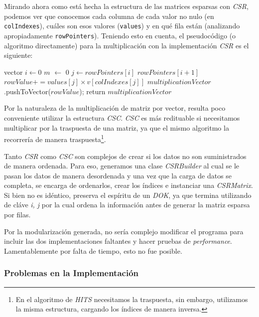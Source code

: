 Mirando ahora como está hecha la estructura de las matrices esparsas con \textit{CSR}, podemos ver que conocemos cada columna de cada valor no nulo (en \texttt{colIndexes}), cuáles son esos valores (\texttt{values}) y en qué fila están (analizando apropiadamente \texttt{rowPointers}). Teniendo esto en cuenta, el pseudocódigo (o algoritmo directamente) para la multiplicación con la implementación \textit{CSR} es el siguiente:

	\vspace{\baselineskip}
	\begin{codebox}
	\li vector 
	\li \For $i \gets 0$ \To $m$ \Do
	\li {} $\gets$ 0
	\li \For $j \gets rowPointers[i]$ \To $rowPointers[i+1]$ \Do
	\li $rowValue += values[j] \times v[colIndexes[j]]$  \End 
	\li
	\li $multiplicationVector$.pushToVector($rowValue$); \End
	\li 
	\li return $multiplicationVector$
	\End
	\end{codebox} 
	\vspace{\baselineskip}

\par	
Por la naturaleza de la multiplicación de matriz por vector, resulta poco conveniente utilizar la estructura \textit{CSC}. \textit{CSC} es más redituable si necesitamos multiplicar por la traspuesta de una matriz, ya que el mismo algoritmo la recorrería de manera traspuesta\footnote{En el algoritmo de \textit{HITS} necesitamos la traspuesta, sin embargo, utilizamos la misma estructura, cargando los índices de manera inversa.}.

	Tanto \textit{CSR} como \textit{CSC} son complejos de crear si los datos no son suministrados de manera ordenada. Para eso, generamos una clase \textit{CSRBuilder} al cual se le pasan los datos de manera desordenada y una vez que la carga de datos se completa, se encarga de ordenarlos, crear los índices e instanciar una \textit{CSRMatrix}. Si bien no es idéntico, preserva el espíritu de un \textit{DOK}, ya que termina utilizando de cláve \textit{i, j} por la cual ordena la información antes de generar la matriz esparsa por filas. 

	Por la modularización generada, no sería complejo modificar el programa para incluir las dos implementaciones faltantes y hacer pruebas de \textit{performance}. Lamentablemente por falta de tiempo, esto no fue posible.

\subsubsection{Problemas en la Implementación}

